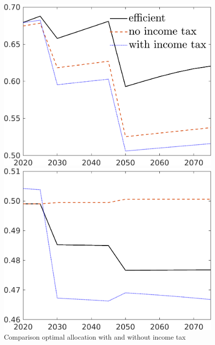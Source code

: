 \begin{figure}[h!!]
	\centering
	\caption{Comparison optimal allocation with and without income tax}\label{fig:comp_nored}
	
	\begin{minipage}[]{0.32\textwidth}
		\includegraphics[width=1\textwidth]{../../codding_model/own_basedOnFried/optimalPol_190722_tidiedUp/figures/all_July22/C_DDCompEffOPT_T_NoTaus_pol3_spillover0_noskill0_sep1_xgrowth0_etaa0.79_lgd1_lff0.png}
	\end{minipage}
	\begin{minipage}[]{0.32\textwidth}
		\includegraphics[width=1\textwidth]{../../codding_model/own_basedOnFried/optimalPol_190722_tidiedUp/figures/all_July22/hh_DDCompEffOPT_T_NoTaus_pol3_spillover0_noskill0_sep1_xgrowth0_etaa0.79_lgd0_lff0.png}

\end{minipage}
\end{figure}
